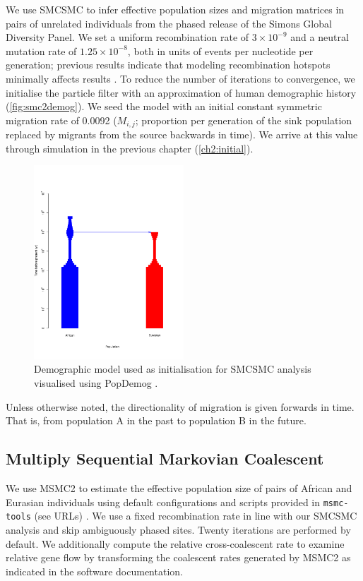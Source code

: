 We use SMCSMC to infer effective population sizes and migration matrices in pairs of unrelated individuals from the phased release of the Simons Global Diversity Panel. We set a uniform recombination rate of $3\times10^{-9}$ and a neutral mutation rate of $1.25\times10^{-8}$, both in units of events per nucleotide per generation; previous results indicate that modeling recombination
hotspots minimally affects results \cite{Li2011}. To reduce the number of iterations to convergence, we initialise the particle filter with an approximation of human demographic history (\autoref{fig:smc2demog}).
We seed the model with an initial constant symmetric  migration rate of 0.0092 ($M_{i,j}$; proportion per generation of the sink population replaced by migrants from the source backwards in time). We arrive at this value through simulation in the previous chapter (\autoref{ch2:initial}).

\begin{figure}
	\centering
	\includegraphics[width=0.5\textwidth]{plot/dem_smc2.pdf}
	\caption[SMCSMC seed demographic model]{Demographic model used as initialisation for SMCSMC analysis visualised using PopDemog \cite{Zhou2018}.}
	\label{fig:smc2demog}
\end{figure}

Unless otherwise noted, the directionality of migration is given forwards in time. That is, from population A in the past to population B in the future. 


\subsection{Multiply Sequential Markovian Coalescent} We use MSMC2 to estimate the effective population size of pairs of African and Eurasian individuals using default configurations and scripts provided in {\tt msmc-tools} (see URLs) \cite{Schiffels2014, Wang2019a}. We use a fixed recombination rate in line with our SMCSMC analysis and skip ambiguously phased sites. Twenty iterations are performed by default. We additionally compute the relative cross-coalescent rate to examine relative gene flow by transforming the coalescent rates generated by MSMC2 as indicated in the software documentation.


